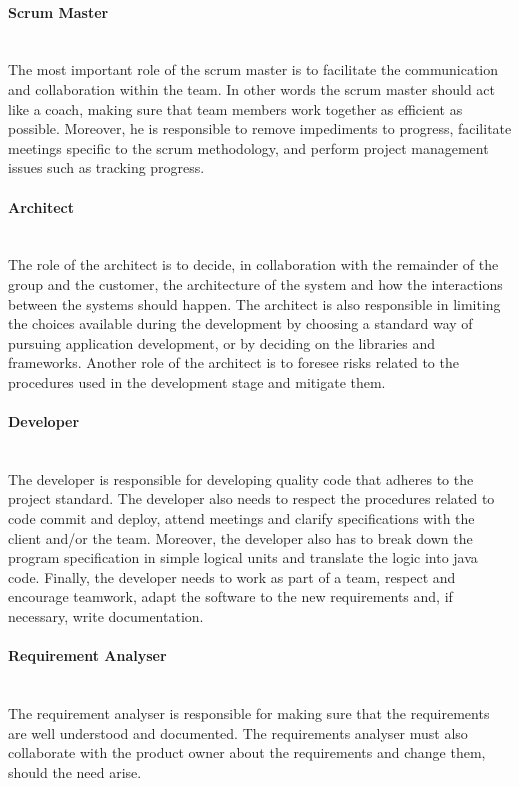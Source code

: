 \documentclass[../document.tex]{subfiles}
\begin{document}
\paragraph{Scrum Master} \ \\
The most important role of the scrum master is to facilitate the communication and collaboration within the team. In other words the scrum master should act like a coach, making sure that team members work together as efficient as possible. Moreover, he is responsible to remove impediments to progress, facilitate meetings specific to the scrum methodology, and perform project management issues such as tracking progress. 

\paragraph{Architect} \ \\
The role of the architect is to decide, in collaboration with the remainder of the group and the customer, the architecture of the system and how the interactions between the systems should happen. The architect is also responsible in limiting the choices available during the development by choosing a standard way of pursuing application development, or by deciding on the libraries and frameworks. Another role of the architect is to foresee risks related to the procedures used in the development stage and mitigate them. 

\paragraph{Developer} \ \\
The developer is responsible for developing quality code that adheres to the project standard. The developer also needs to respect the procedures related to code commit and deploy, attend meetings and clarify specifications with the client and/or the team. Moreover, the developer also has to break down the program specification in simple logical units and translate the logic into java code. Finally, the developer needs to work as part of a team, respect and encourage teamwork, adapt the software to the new requirements and, if necessary, write documentation.

\paragraph{Requirement Analyser} \ \\
The requirement analyser is responsible for making sure that the requirements are well understood and documented. The requirements analyser must also collaborate with the product owner about the requirements and change them, should the need arise.
\end{document}
